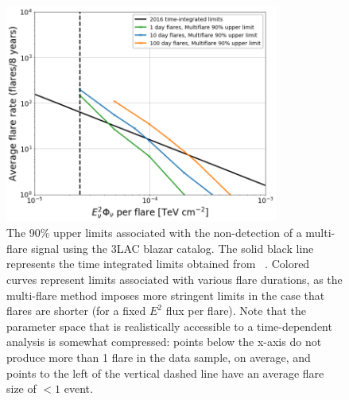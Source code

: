 \begin{figure}[h]
\centering
\includegraphics[width=0.8\textwidth]{figs/3lac_lims.png}
\caption{The 90\% upper limits associated with the non-detection of a multi-flare signal using the 3LAC blazar catalog. The solid black line represents the time integrated limits obtained from ~\cite{2lac_ic}. Colored curves represent limits associated with various flare durations, as the multi-flare method imposes more stringent limits in the case that flares are shorter (for a fixed $E^2$ flux per flare). Note that the parameter space that is realistically accessible to a time-dependent analysis is somewhat compressed: points below the x-axis do not produce more than 1 flare in the data sample, on average, and points to the left of the vertical dashed line have an average flare size of $< 1$ event.}
\label{fig:3laclimits}
\end{figure}


